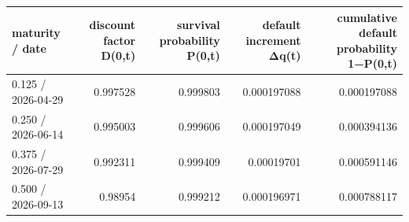 \begin{tabular}{lrrrr}
\toprule
maturity / date & discount factor D(0,t) & survival probability P(0,t) & default increment Δq(t) & cumulative default probability 1−P(0,t) \\
\midrule
0.125 / 2026-04-29 & 0.997528 & 0.999803 & 0.000197088 & 0.000197088 \\
0.250 / 2026-06-14 & 0.995003 & 0.999606 & 0.000197049 & 0.000394136 \\
0.375 / 2026-07-29 & 0.992311 & 0.999409 & 0.00019701 & 0.000591146 \\
0.500 / 2026-09-13 & 0.98954 & 0.999212 & 0.000196971 & 0.000788117 \\
\bottomrule
\end{tabular}
